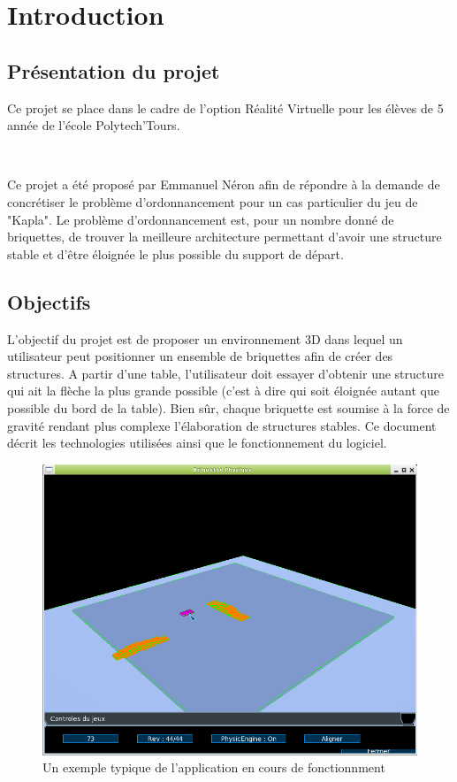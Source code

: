 \documentclass[frenchb,twoside]{EPURapport}
\begin{document}
\chapter{Introduction}

\section{Présentation du projet}

	Ce projet se place dans le cadre de l'option Réalité Virtuelle pour les
	élèves de 5 année de l'école Polytech'Tours.
	
	\
	
	Ce projet a été proposé par Emmanuel Néron afin de répondre à la demande
	de concrétiser le problème d'ordonnancement pour un cas particulier du jeu
	de "Kapla". Le problème d'ordonnancement est, pour un nombre donné de
	briquettes, de trouver la meilleure architecture permettant d'avoir une
	structure stable et d'être éloignée le plus possible du support de départ.

\section{Objectifs}
    L'objectif du projet est de proposer un environnement 3D dans lequel un
    utilisateur peut positionner un ensemble de briquettes afin de créer des
    structures. A partir d'une table, l'utilisateur doit essayer d'obtenir une
    structure qui ait la flèche la plus grande possible (c'est à dire qui soit
    éloignée autant que possible du bord de la table).
    Bien sûr, chaque briquette est soumise à la force de gravité rendant plus
    complexe l'élaboration de structures stables.
    Ce document décrit les technologies utilisées ainsi que le fonctionnement du
    logiciel.
    
    \begin{figure}[h]
		\centering
        \includegraphics[width=13cm]{images/jeux.png}
        \caption{\label{fig:jeux}Un exemple typique de l'application en cours de fonctionnment}
    \end{figure}
\end{document}
